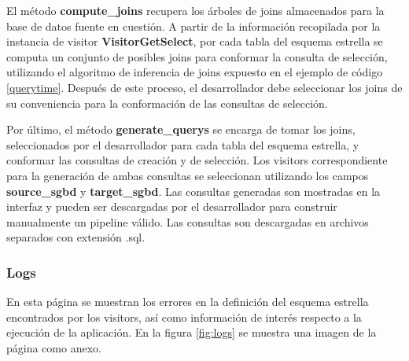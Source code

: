 El método \textbf{compute\_joins} recupera los \'arboles de joins almacenados para la base de datos 
fuente en cuestión. A partir de la información recopilada por la instancia de visitor \textbf{VisitorGetSelect}, 
por cada tabla del esquema estrella se computa un conjunto de posibles joins para conformar la consulta 
de selección, utilizando el algoritmo de inferencia de joins expuesto en el ejemplo de código \ref{querytime}. 
Despu\'es de este proceso, el desarrollador debe seleccionar 
los joins de su conveniencia para la conformación de las consultas de selección. 

Por \'ultimo, el método \textbf{generate\_querys} se encarga de tomar los joins, seleccionados por el desarrollador para 
cada tabla del esquema estrella, y conformar las consultas de creación y de selección. Los visitors 
correspondiente para la generación de ambas consultas se seleccionan utilizando los campos 
\textbf{source\_sgbd} y \textbf{target\_sgbd}. Las consultas generadas son mostradas en la interfaz y pueden ser descargadas 
por el desarrollador para construir manualmente un pipeline válido. 
Las consultas son descargadas en archivos separados con extensión .sql.

\subsubsection{Logs}

En esta página se muestran los errores en la definición del esquema
estrella encontrados por los visitors, así como información de interés
respecto a la ejecución de la aplicación. En la figura \ref{fig:logs} se muestra una imagen de la 
página como anexo.